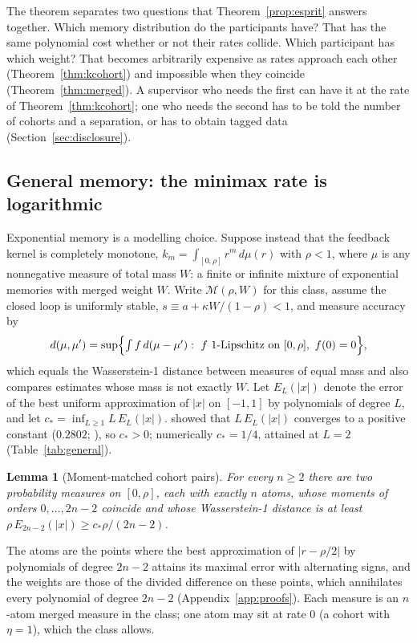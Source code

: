 \documentclass[12pt]{article}
\newtheorem{lemma}[theorem]{Lemma}
\theoremstyle{definition}
\theoremstyle{remark}
\begin{document}
The theorem separates two questions that Theorem~\ref{prop:esprit} answers together. Which memory distribution do the participants have? That has the same polynomial cost whether or not their rates collide. Which participant has which weight? That becomes arbitrarily expensive as rates approach each other (Theorem~\ref{thm:kcohort}) and impossible when they coincide (Theorem~\ref{thm:merged}). A supervisor who needs the first can have it at the rate of Theorem~\ref{thm:kcohort}; one who needs the second has to be told the number of cohorts and a separation, or has to obtain tagged data (Section~\ref{sec:disclosure}).

\subsection{General memory: the minimax rate is logarithmic}\label{sec:general}

Exponential memory is a modelling choice. Suppose instead that the feedback kernel is completely monotone, $k_m=\int_{[0,\rho]}r^m\,d\mu(r)$ with $\rho<1$, where $\mu$ is any nonnegative measure of total mass $W$: a finite or infinite mixture of exponential memories with merged weight $W$. Write $\mathcal M(\rho,W)$ for this class, assume the closed loop is uniformly stable, $s\equiv a+\kappa W/(1-\rho)<1$, and measure accuracy by
\[
d(\mu,\mu')=\sup\Bigl\{\textstyle\int f\,d(\mu-\mu'):\ f\ \text{1-Lipschitz on }[0,\rho],\ f(0)=0\Bigr\},
\]
which equals the Wasserstein-1 distance between measures of equal mass and also compares estimates whose mass is not exactly $W$. Let $E_L(|x|)$ denote the error of the best uniform approximation of $|x|$ on $[-1,1]$ by polynomials of degree $L$, and let $c_*=\inf_{L\ge1}L\,E_L(|x|)$. \citet{bernstein1914} showed that $L\,E_L(|x|)$ converges to a positive constant ($0.2802$; \citealp{varga1985}), so $c_*>0$; numerically $c_*=1/4$, attained at $L=2$ (Table~\ref{tab:general}).

\begin{lemma}[Moment-matched cohort pairs]\label{lem:altpair}
For every $n\ge2$ there are two probability measures on $[0,\rho]$, each with exactly $n$ atoms, whose moments of orders $0,\ldots,2n-2$ coincide and whose Wasserstein-1 distance is at least $\rho\,E_{2n-2}(|x|)\ge c_*\rho/(2n-2)$.
\end{lemma}

The atoms are the points where the best approximation of $|r-\rho/2|$ by polynomials of degree $2n-2$ attains its maximal error with alternating signs, and the weights are those of the divided difference on these points, which annihilates every polynomial of degree $2n-2$ (Appendix~\ref{app:proofs}). Each measure is an $n$-atom merged measure in the class; one atom may sit at rate $0$ (a cohort with $\eta=1$), which the class allows.
\end{document}
